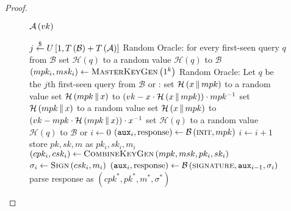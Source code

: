 \begin{proof}
      \begin{figure}[!htbp]
        \begin{algobox}{$\mathcal{A}\left(vk\right)$}
          \begin{algorithmic}[1]
            \State $j \overset{\$}{\gets} U\left[1, T\left(\mathcal{B}\right) +
            T\left(\mathcal{A}\right)\right]$
            \Indent
              \State Random Oracle: for every first-seen query $q$ from
              $\mathcal{B}$ set $\mathcal{H}\left(q\right)$ to a random value
              \State \Return $\mathcal{H}\left(q\right)$ to $\mathcal{B}$
            \EndIndent
            \State $\left(mpk_i, msk_i\right) \gets
            \textsc{MasterKeyGen}\left(1^k\right)$
            \Indent
              \State Random Oracle: Let $q$ be the $j$th first-seen query from
              $\mathcal{B}$ or \adversary:
                \State set $\mathcal{H}\left(x \,\|\, mpk\right)$ to a random
                value
                \State set $\mathcal{H}\left(mpk \,\|\, x\right)$ to $\left(vk
                - x \cdot \mathcal{H}\left(x \,\|\, mpk\right)\right) \cdot
                mpk^{-1}$
                \State set $\mathcal{H}\left(mpk \,\|\, x\right)$ to a random
                value
                \State set $\mathcal{H}\left(x \,\|\, mpk\right)$ to $\left(vk
                - mpk \cdot \mathcal{H}\left(mpk \,\|\, x\right)\right) \cdot
                x^{-1}$
              \Else
                \State set $\mathcal{H}\left(q\right)$ to a random value
              \EndIf
              \State \Return $\mathcal{H}\left(q\right)$ to $\mathcal{B}$ or
              \adversary
            \EndIndent
            \State $i \gets 0$
            \State $\left(\mathtt{aux}_i, \mathrm{response}\right) \gets
            \mathcal{B}\left(\textsc{init}, mpk\right)$
              \State $i \gets i + 1$
              \State store $pk, sk, m$ as $pk_i, sk_i, m_i$
              \State $\left(cpk_i, csk_i\right) \gets
              \textsc{CombineKeyGen}\left(mpk, msk, pk_i, sk_i\right)$
              \State $\sigma_i \gets \textsc{Sign}\left(csk_i, m_i\right)$
              \State $\left(\mathtt{aux}_i, \mathrm{response}\right) \gets
              \mathcal{B}\left(\textsc{signature}, \mathtt{aux}_{i-1},
              \sigma_i\right)$
            \EndWhile
            \State parse response as $\left(cpk^*, pk^*, m^*, \sigma^*\right)$

\end{algorithmic}
\end{algobox}
\end{figure}
\end{proof}
